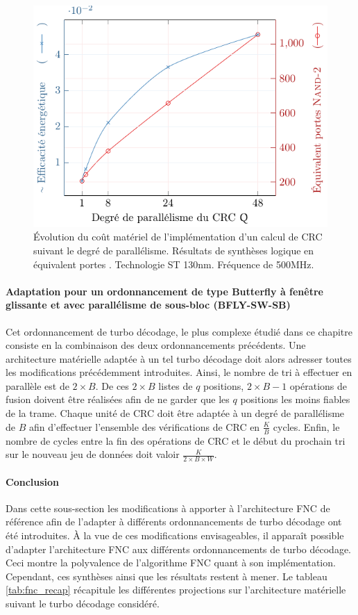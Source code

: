 \begin{figure}[!tb]
	\centering
	\includegraphics{main/ch4_fig/implem/crc.pdf}
	\caption{Évolution du coût matériel de l'implémentation d'un calcul de CRC suivant le degré de parallélisme.
	Résultats de synthèses logique en équivalent portes . Technologie ST 130nm. Fréquence de 500MHz.}
	\label{fig:crc_par}
\end{figure}

\paragraph*{Adaptation pour un ordonnancement de type Butterfly à fenêtre glissante et avec parallélisme de sous-bloc 
(BFLY-SW-SB)}
Cet ordonnancement de turbo décodage, le plus complexe étudié dans ce chapitre consiste en la combinaison des
deux ordonnancements précédents. Une architecture matérielle adaptée à un tel turbo décodage doit alors adresser 
toutes les modifications précédemment introduites. Ainsi, le nombre de tri à effectuer en parallèle est de $2\times B$. 
De ces $2\times B$ listes de
$q$ positions, $2\times B-1$ opérations de fusion doivent être réalisées afin de ne garder que les $q$ positions les moins 
fiables de la trame. Chaque unité de CRC doit être adaptée à un degré de parallélisme de $B$ afin d'effectuer 
l'ensemble des 
vérifications de CRC en $\frac{K}{B}$ cycles. Enfin, le nombre de cycles entre la fin des 
opérations de CRC et le début du prochain tri sur le nouveau jeu de données doit valoir $\frac{K}{2\times B\times W}$.

\paragraph*{Conclusion}
Dans cette sous-section les modifications à apporter à l'architecture FNC de référence afin de l'adapter à différents 
ordonnancements de turbo décodage ont été introduites. À la vue de ces modifications
envisageables, il apparaît possible 
d'adapter l'architecture FNC aux différents ordonnancements de turbo décodage. Ceci montre la polyvalence de l'algorithme
FNC quant à son implémentation. Cependant, ces synthèses ainsi que les résultats restent à mener. Le tableau \ref{tab:fnc_recap} récapitule les différentes projections sur l'architecture matérielle suivant le 
turbo décodage considéré.

